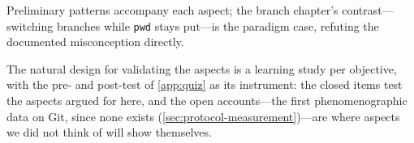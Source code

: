 \rqpatterns*
Preliminary patterns accompany each aspect; the branch chapter's
contrast---switching branches while \texttt{pwd} stays put---is the
paradigm case, refuting the documented misconception directly.

The natural design for validating the aspects is a learning study
\autocite[Ch.~7]{NCOL} per objective, with the pre- and post-test of
\cref{app:quiz} as its instrument: the closed items test the aspects
argued for here, and the open accounts---the first phenomenographic data
on Git, since none exists (\cref{sec:protocol-measurement})---are where
aspects we did not think of will show themselves.
